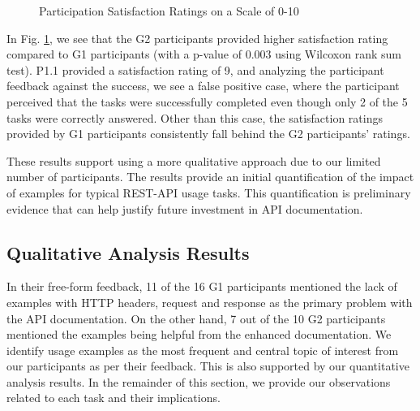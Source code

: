 \begin{figure}[h]
\centering

\caption{Participation Satisfaction Ratings on a Scale of 0-10}
\label{fig:rating}

\end{figure}

In Fig. \ref{fig:rating}, we see that the G2 participants provided higher satisfaction rating compared to G1 participants (with a p-value of 0.003 using Wilcoxon rank sum test). P1.1 provided a satisfaction rating of 9, and analyzing the participant feedback against the success, we see a false positive case, where the participant perceived that the tasks were successfully completed even though only 2 of the 5 tasks were correctly answered. Other than this case, the satisfaction ratings provided by G1 participants consistently fall behind the G2 participants' ratings.

These results support using a more qualitative approach due to our limited number of participants. The results provide an initial quantification of the impact of examples for typical REST-API usage tasks. This quantification is preliminary evidence that can help justify future investment in API documentation.


\subsection{Qualitative Analysis Results} %

In their free-form feedback, 11 of the 16 G1 participants mentioned the lack of examples with HTTP headers, request and response as the primary problem with the API documentation. On the other hand, 7 out of the 10 G2 participants mentioned the examples being helpful from the enhanced documentation. We identify usage examples as the most frequent and central topic of interest from our participants as per their feedback. This is also supported by our quantitative analysis results. In the remainder of this section, we provide our observations related to each task and their implications.


